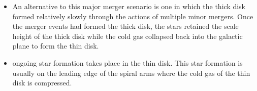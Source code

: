 \begin{longtabu}
\begin{itemize}[noitemsep]
\begin{itemize}[noitemsep]
				\item An alternative to this major merger scenario is one in which the thick disk formed relatively slowly through the actions of multiple minor mergers. Once the merger events had formed the thick disk, the stars retained the scale height of the thick disk while the cold gas collapsed back into the galactic plane to form the thin disk.
				\item ongoing star formation takes place in the thin disk. This star formation is usually on the leading edge of the spiral arms where the cold gas of the thin disk is compressed.
			\end{itemize}
	\end{itemize}
	\\
	\hline
\end{longtabu}
			
